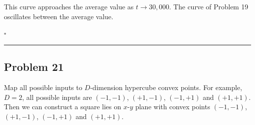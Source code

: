 \documentclass[12pt]{article}
\newcommand*{\QEDB}{\hfill\ensuremath{\square}}
\newcommand{\ParTh}[1]{\left(#1\right)}
\newcommand{\horrule}[1]{\rule{\linewidth}{#1}}
\begin{document}
This curve approaches the average value as $t\rightarrow30,000$. The curve of Problem 19 oscillates between the average value.

\QEDB

\horrule{0.5pt}

\subsection*{Problem 21}

Map all possible inputs to $D$-dimension hypercube convex points. For example, $D=2$, all possible inputs are $\ParTh{-1,-1}$, $\ParTh{+1,-1}$, $\ParTh{-1,+1}$ and $\ParTh{+1,+1}$. Then we can construct a square lies on $x\text{-}y$ plane with convex points $\ParTh{-1,-1}$, $\ParTh{+1,-1}$, $\ParTh{-1,+1}$ and $\ParTh{+1,+1}$.
\end{document}
